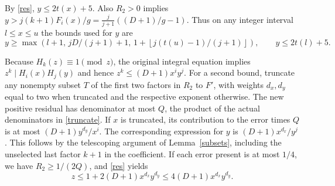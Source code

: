 \documentclass[11pt]{article}
\newcommand{\fl}[1]{\left\lfloor #1\right\rfloor}
\begin{document}
By \eqref{res}, $y\le2t(x)+5$. Also $R_2>0$ implies $y>j(k+1)F_i(x)/g=\frac{j}{j+1}((D+1)/g-1)$. Thus on any integer interval $l\le x\le u$ the bounds used for $y$ are
\begin{equation}
 y\ge\max\left(l+1,\,jD/(j+1)+1,\,1+\fl{j(t(u)-1)/(j+1)}\right),\qquad y\le2t(l)+5.\label{yrange}
\end{equation}

Because $H_k(z)\equiv1\pmod z$, the original integral equation implies $z^k\mid H_i(x)H_j(y)$ and hence $z^k\le(D+1)x^iy^j$. For a second bound, truncate any nonempty subset $T$ of the first two factors in $R_2$ to $F'$, with weights $d_x,d_y$ equal to two when truncated and the respective exponent otherwise. The new positive residual has denominator at most $Q$, the product of the actual denominators in \eqref{truncate}. If $x$ is truncated, its contribution to the error times $Q$ is at most $(D+1)y^{d_y}/x^i$. The corresponding expression for $y$ is $(D+1)x^{d_x}/y^j$. This follows by the telescoping argument of Lemma~\ref{subsets}, including the unselected last factor $k+1$ in the coefficient. If each error present is at most $1/4$, we have $R_2\ge1/(2Q)$, and \eqref{res} yields
\begin{equation}
 z\le 1+2(D+1)x^{d_x}y^{d_y}\le 4(D+1)x^{d_x}y^{d_y}.\label{zrange}
\end{equation}
\end{document}
